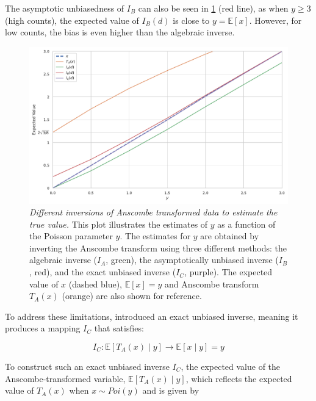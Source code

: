 The asymptotic unbiasedness of $I_B$ can also be seen in \cref{fig:anscombe-expectation-inversion} (red line), as when $y \geq 3$ (high counts), the expected value of $I_B(d)$ is close to $y=\mathbb{E}[x]$. However, for low counts, the bias is even higher than the algebraic inverse.

\begin{figure}
    \centering
    \includegraphics[width=1\linewidth]{images/anscombe_expectation_inversion.pdf}
    \caption{\textit{Different inversions of Anscombe transformed data to estimate the true value.} This plot illustrates the estimates of $y$ as a function of the Poisson parameter $y$. The estimates for $y$ are obtained by inverting the Anscombe transform using three different methods: the algebraic inverse ($I_A$, green), the asymptotically unbiased inverse ($I_B$, red), and the exact unbiased inverse ($I_C$, purple). The expected value of $x$ (dashed blue), $\mathbb{E}[x]=y$ and Anscombe transform $T_A(x)$ (orange) are also shown for reference.}
    \label{fig:anscombe-expectation-inversion}
\end{figure}


To address these limitations, \citeauthor{makitaloOptimalInversionAnscombe2011} introduced an exact unbiased inverse, meaning it produces a mapping $I_C$ that satisfies:

\begin{equation}
    I_C: \mathbb{E}[T_A(x) \mid y] \to \mathbb{E}[x \mid y] = y
\end{equation}

To construct such an exact unbiased inverse $I_C$, the expected value of the Anscombe-transformed variable, $\mathbb{E}[T_A(x) \mid y]$, which reflects the expected value of  $T_A(x) $ when $x \sim Poi(y)$ and is given by


